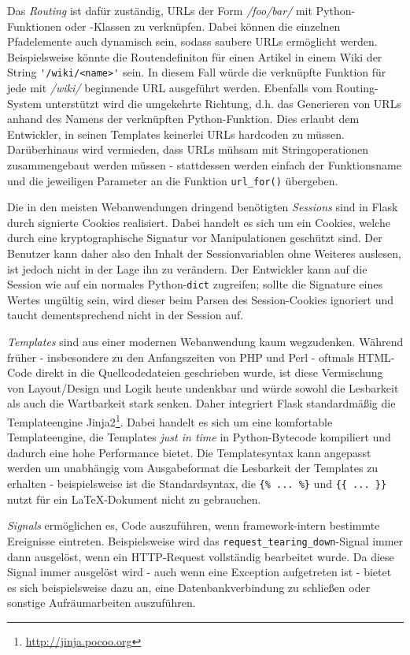 Das \emph{Routing} ist dafür zuständig, URLs der Form \emph{/foo/bar/} mit Python-Funktionen oder
-Klassen zu verknüpfen. Dabei können die einzelnen Pfadelemente auch dynamisch sein, sodass saubere
URLs ermöglicht werden. Beispielsweise könnte die Routendefiniton für einen Artikel in einem
Wiki der String \lstinline{'/wiki/<name>'} sein. In diesem Fall würde die verknüpfte Funktion für
jede mit \emph{/wiki/} beginnende URL ausgeführt werden. Ebenfalls vom Routing-System unterstützt
wird die umgekehrte Richtung, d.h. das Generieren von URLs anhand des Namens der verknüpften
Python-Funktion. Dies erlaubt dem Entwickler, in seinen Templates keinerlei URLs hardcoden zu
müssen. Darüberhinaus wird vermieden, dass URLs mühsam mit Stringoperationen zusammengebaut werden
müssen - stattdessen werden einfach der Funktionsname und die jeweiligen Parameter an die Funktion
\lstinline{url_for()} übergeben.

Die in den meisten Webanwendungen dringend benötigten \emph{Sessions} sind in Flask durch signierte
Cookies realisiert. Dabei handelt es sich um ein Cookies, welche durch eine kryptographische
Signatur vor Manipulationen geschützt sind. Der Benutzer kann daher also den Inhalt der
Sessionvariablen ohne Weiteres auslesen, ist jedoch nicht in der Lage ihn zu verändern. Der
Entwickler kann auf die Session wie auf ein normales Python-\lstinline{dict} zugreifen; sollte die
Signature eines Wertes ungültig sein, wird dieser beim Parsen des Session-Cookies ignoriert und
taucht dementsprechend nicht in der Session auf.

\emph{Templates} sind aus einer modernen Webanwendung kaum wegzudenken. Während früher -
insbesondere zu den Anfangszeiten von PHP und Perl - oftmals HTML-Code direkt in die
Quellcodedateien geschrieben wurde, ist diese Vermischung von Layout/Design und Logik heute
undenkbar und würde sowohl die Lesbarkeit als auch die Wartbarkeit stark senken. Daher integriert
Flask standardmäßig die Templateengine
Jinja2\footnote{\href{http://jinja.pocoo.org}{http://jinja.pocoo.org}}. Dabei handelt es sich um
eine komfortable Templateengine, die Templates \emph{just in time} in Python-Bytecode kompiliert und
dadurch eine hohe Performance bietet. Die Templatesyntax kann angepasst werden um unabhängig vom
Ausgabeformat die Lesbarkeit der Templates zu erhalten - beispielsweise ist die Standardsyntax, die
\lstinline|{% ... %}| und \lstinline|{{ ... }}| nutzt für ein \LaTeX-Dokument nicht zu
gebrauchen.

\emph{Signals} ermöglichen es, Code auszuführen, wenn framework-intern bestimmte Ereignisse
eintreten. Beispielsweise wird das \lstinline{request_tearing_down}-Signal immer dann ausgelöst,
wenn ein HTTP-Request vollständig bearbeitet wurde. Da diese Signal immer ausgelöst wird - auch wenn
eine Exception aufgetreten ist - bietet es sich beispielsweise dazu an, eine Datenbankverbindung zu
schließen oder sonstige Aufräumarbeiten auszuführen.
